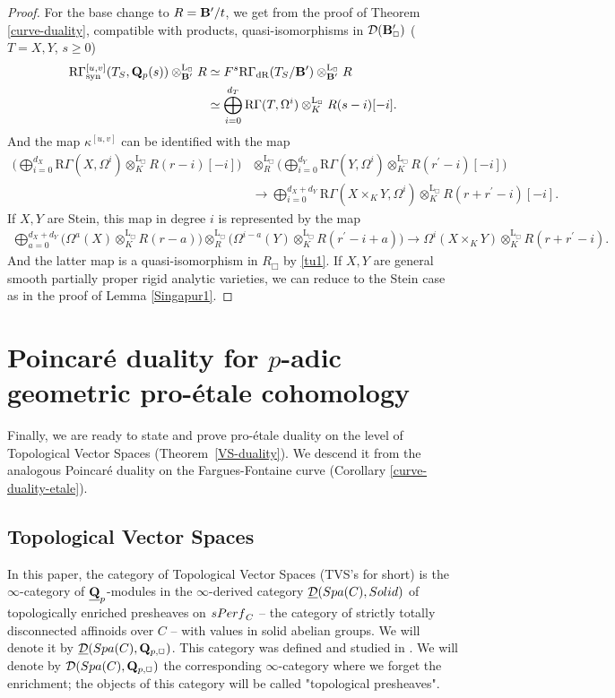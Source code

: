 \documentclass[10pt,reqno]{amsart}
\theoremstyle{definition}
\theoremstyle{remark}
\newcommand{\dr}{\operatorname{dR} }
\newcommand{\synt}{ \operatorname{syn} }
\newcommand{\LL}{\operatorname{L} }
\newcommand{\sd}{{\mathcal{D}}}
\numberwithin{equation}{section}
\def\R{{\mathrm R}}
\def\Q{{\bf Q}} \def\Z{{\bf Z}}
\def\TVS{TVS, VS, BC}
\def\PERF{${\rm Perf}_C$, ${\rm Perf}_S$, ${\rm sPerf}_C$}
\numberwithin{equation}{section}
\begin{document}
\begin{proof}
 
  For the base change to $R={\bf B}^{\prime}/t$, we get from the proof of Theorem \ref{curve-duality}, compatible with products,  quasi-isomorphisms in 
  $\sd(\B^{\prime}_{\Box})$ ($T=X,Y$, $s\geq 0$)
\begin{align*}
 \R\Gamma^{{[u,v]}}_{\synt}(T_S,  \Q_p(s))\otimes^{\LL_{\Box}}_{\B^{\prime}} R& \simeq F^s\R\Gamma_{\dr}(T_S/\B^{\prime})\otimes^{\LL_{\Box}}_{\B^{\prime}} R \\
 & \simeq  \bigoplus_{i=0}^{d_T}\R\Gamma(T, \Omega^i) \otimes^{\LL_{\Box}}_KR(s-i)[-i].
 \end{align*}
 And the map $ \kappa^{[u,v]}$ can be identified with the map
 \begin{align*}
 \Big(\bigoplus_{i=0}^{d_X}\R\Gamma(X,\Omega^i) \otimes^{\LL_{\Box}}_KR(r-i)[-i] \Big)
 & \otimes^{\LL_{\Box}}_{R}
\Big(\bigoplus_{i=0}^{d_Y}\R\Gamma(Y,\Omega^i) \otimes^{\LL_{\Box}}_KR(r^{\prime}-i)[-i] \Big)\\
  & \to \bigoplus_{i=0}^{d_{X}+d_{Y}}\R\Gamma(X\times_K Y, \Omega^i) \otimes^{\LL_{\Box}}_KR(r+r^{\prime}-i)[-i].
 \end{align*}
 If $X, Y$ are Stein, this map 
  in degree $i$ is represented by  the map
  \begin{align*}
 \bigoplus_{a=0}^{d_X+d_Y}\Big(\Omega^a(X) \otimes^{\LL_{\Box}}_KR(r-a)\Big)
\otimes^{\LL_{\Box}}_{R}
\Big(\Omega^{i-a}(Y) \otimes^{\LL_{\Box}}_KR(r^{\prime}-i+a)\Big)
 \to\Omega^i(X\times_K Y) \otimes^{\LL_{\Box}}_KR(r+r^{\prime}-i).
 \end{align*}
 And the latter  map is   a quasi-isomorphism in  $R_{\Box}$ by \eqref{tu1}. If $X, Y$ are general smooth partially proper rigid analytic varieties, we can reduce to the Stein case as in the proof of Lemma \ref{Singapur1}.
 \end{proof}
\section{Poincar\'e duality for $p$-adic  geometric pro-\'etale cohomology}
Finally, we are  ready to state and prove pro-\'etale duality on the level of Topological Vector Spaces
(Theorem~\ref{VS-duality}). We descend it from the analogous Poincar\'e duality on the Fargues-Fontaine curve (Corollary \ref{curve-duality-etale}). 
\subsection{Topological Vector Spaces}
 In this paper, the category of Topological Vector Spaces 
\index{TVS@\TVS}({\rm TVS}'s for short) is the $\infty$-category of $\underline{\Q}_p$-modules in the $\infty$-derived category 
 $\underline{\sd}({\rm Spa}(C),{\rm Solid})$ of topologically enriched presheaves 
\index{PERF@\PERF}on ${\rm sPerf}_C$ -- the category of strictly totally disconnected affinoids over $C$ -- with values in solid abelian groups.  We will denote it by  $\underline{\sd}({\rm Spa}(C),\Q_{p,\Box})$. This category was defined and studied in \cite{TVS}. We will denote by 
 $ {\sd}({\rm Spa}(C),\Q_{p,\Box})$ the corresponding $\infty$-category where we forget the enrichment; the objects of this category will be called "topological presheaves". 
\end{document}
